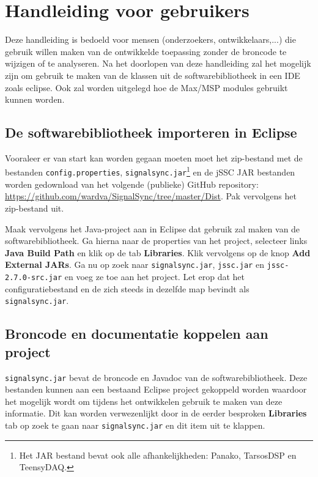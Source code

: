 \chapter{Handleiding voor gebruikers}
\label{appendix-f}

Deze handleiding is bedoeld voor mensen (onderzoekers, ontwikkelaars,...) die gebruik willen maken van de ontwikkelde toepassing zonder de broncode te wijzigen of te analyseren. Na het doorlopen van deze handleiding zal het mogelijk zijn om gebruik te maken van de klassen uit de softwarebibliotheek in een IDE zoals eclipse. Ook zal worden uitgelegd hoe de Max/MSP modules gebruikt kunnen worden.

\section*{De softwarebibliotheek importeren in Eclipse}

Vooraleer er van start kan worden gegaan moeten moet het zip-bestand met de bestanden \texttt{config.properties}, \texttt{signalsync.jar}\footnote{Het JAR bestand bevat ook alle afhankelijkheden: Panako\cite{six2014panako}, TarsosDSP\cite{six2014tarsosdsp} en TeensyDAQ.} en de jSSC JAR bestanden worden gedownload van het volgende (publieke) GitHub repository:
\url{https://github.com/wardva/SignalSync/tree/master/Dist}. Pak vervolgens het zip-bestand uit.

Maak vervolgens het Java-project aan in Eclipse dat gebruik zal maken van de softwarebibliotheek. Ga hierna naar de properties van het project, selecteer links \textbf{Java Build Path} en klik op de tab \textbf{Libraries}. Klik vervolgens op de knop \textbf{Add External JARs}. Ga nu op zoek naar \texttt{signalsync.jar}, \texttt{jssc.jar} en \texttt{jssc-2.7.0-src.jar} en voeg ze toe aan het project. Let erop dat het configuratiebestand en de zich steeds in dezelfde map bevindt als \texttt{signalsync.jar}.

\section*{Broncode en documentatie koppelen aan project}

\texttt{signalsync.jar} bevat de broncode en Javadoc van de softwarebibliotheek. Deze bestanden kunnen aan een bestaand Eclipse project gekoppeld worden waardoor het mogelijk wordt om tijdens het ontwikkelen gebruik te maken van deze informatie. Dit kan worden verwezenlijkt door in de eerder besproken \textbf{Libraries} tab op zoek te gaan naar \texttt{signalsync.jar} en dit item uit te klappen. 

